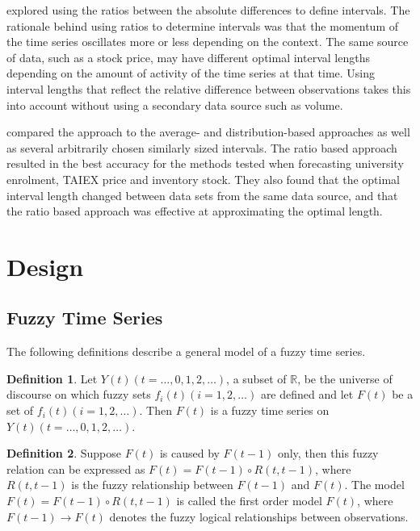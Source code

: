 \documentclass[12pt]{article}
\theoremstyle{definition}
\newtheorem{ftsdef}{Definition}
\begin{document}
\cite{huarng2006ratio} explored using the ratios between the absolute differences to define intervals. The rationale behind using ratios to determine intervals was that the momentum of the time series oscillates more or less depending on the context. The same source of data, such as a stock price, may have different optimal interval lengths depending on the amount of activity of the time series at that time. Using interval lengths that reflect the relative difference between observations takes this into account without using a secondary data source such as volume.

\cite{huarng2006ratio} compared the approach to the average- and distribution-based approaches as well as several arbitrarily chosen similarly sized intervals. The ratio based approach resulted in the best accuracy for the methods tested when forecasting university enrolment, TAIEX price and inventory stock. They also found that the optimal interval length changed between data sets from the same data source, and that the ratio based approach was effective at approximating the optimal length.

\section{Design}

\label{design}

\subsection{Fuzzy Time Series}
\label{fts-design}
The following definitions describe a general model of a fuzzy time series.

\begin{ftsdef}
\label{def1}
Let $Y(t)(t= \ldots,0,1,2, \ldots)$, a subset of $\mathbb{R}$, be the universe of discourse on which fuzzy sets $f_i(t)(i=1,2,\ldots)$ are defined and let $F(t)$ be a set of $f_i(t)(i=1,2,\ldots)$. Then $F(t)$ is a fuzzy time series on $Y(t)(t= \ldots,0,1,2, \ldots)$.
\end{ftsdef}

\begin{ftsdef}
\label{def2}
Suppose $F(t)$ is caused by $F(t-1)$ only, then this fuzzy relation can be expressed as $F(t)=F(t-1) \circ R(t,t-1)$, where $R(t,t-1)$ is the fuzzy relationship between $F(t-1)$ and $F(t)$. The model $F(t)=F(t-1) \circ R(t,t-1)$ is called the first order model $F(t)$, where $F(t-1) \rightarrow F(t)$ denotes the fuzzy logical relationships between observations.
\end{ftsdef}
\end{document}
